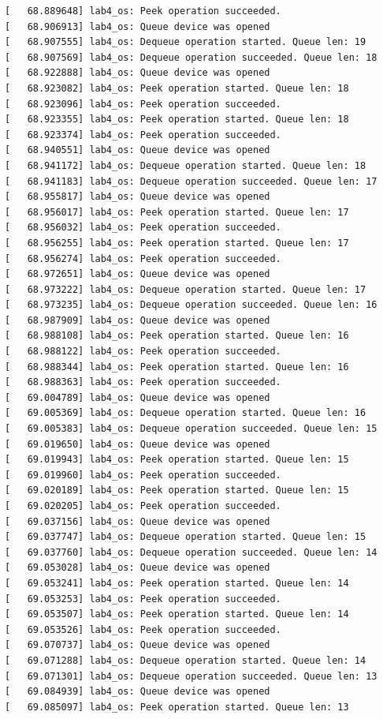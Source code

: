 \documentclass[a4paper,14pt]{extarticle}
\begin{document}
\begin{verbatim}
[   68.889648] lab4_os: Peek operation succeeded.
[   68.906913] lab4_os: Queue device was opened
[   68.907555] lab4_os: Dequeue operation started. Queue len: 19
[   68.907569] lab4_os: Dequeue operation succeeded. Queue len: 18
[   68.922888] lab4_os: Queue device was opened
[   68.923082] lab4_os: Peek operation started. Queue len: 18
[   68.923096] lab4_os: Peek operation succeeded.
[   68.923355] lab4_os: Peek operation started. Queue len: 18
[   68.923374] lab4_os: Peek operation succeeded.
[   68.940551] lab4_os: Queue device was opened
[   68.941172] lab4_os: Dequeue operation started. Queue len: 18
[   68.941183] lab4_os: Dequeue operation succeeded. Queue len: 17
[   68.955817] lab4_os: Queue device was opened
[   68.956017] lab4_os: Peek operation started. Queue len: 17
[   68.956032] lab4_os: Peek operation succeeded.
[   68.956255] lab4_os: Peek operation started. Queue len: 17
[   68.956274] lab4_os: Peek operation succeeded.
[   68.972651] lab4_os: Queue device was opened
[   68.973222] lab4_os: Dequeue operation started. Queue len: 17
[   68.973235] lab4_os: Dequeue operation succeeded. Queue len: 16
[   68.987909] lab4_os: Queue device was opened
[   68.988108] lab4_os: Peek operation started. Queue len: 16
[   68.988122] lab4_os: Peek operation succeeded.
[   68.988344] lab4_os: Peek operation started. Queue len: 16
[   68.988363] lab4_os: Peek operation succeeded.
[   69.004789] lab4_os: Queue device was opened
[   69.005369] lab4_os: Dequeue operation started. Queue len: 16
[   69.005383] lab4_os: Dequeue operation succeeded. Queue len: 15
[   69.019650] lab4_os: Queue device was opened
[   69.019943] lab4_os: Peek operation started. Queue len: 15
[   69.019960] lab4_os: Peek operation succeeded.
[   69.020189] lab4_os: Peek operation started. Queue len: 15
[   69.020205] lab4_os: Peek operation succeeded.
[   69.037156] lab4_os: Queue device was opened
[   69.037747] lab4_os: Dequeue operation started. Queue len: 15
[   69.037760] lab4_os: Dequeue operation succeeded. Queue len: 14
[   69.053028] lab4_os: Queue device was opened
[   69.053241] lab4_os: Peek operation started. Queue len: 14
[   69.053253] lab4_os: Peek operation succeeded.
[   69.053507] lab4_os: Peek operation started. Queue len: 14
[   69.053526] lab4_os: Peek operation succeeded.
[   69.070737] lab4_os: Queue device was opened
[   69.071288] lab4_os: Dequeue operation started. Queue len: 14
[   69.071301] lab4_os: Dequeue operation succeeded. Queue len: 13
[   69.084939] lab4_os: Queue device was opened
[   69.085097] lab4_os: Peek operation started. Queue len: 13

\end{verbatim}
\end{document}
